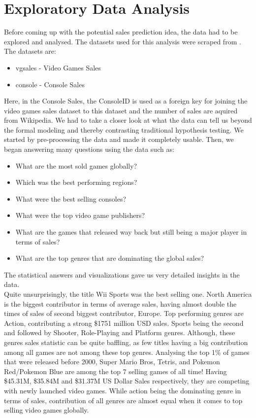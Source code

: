 \documentclass[conference]{IEEEtran}
\begin{document}
\section{Exploratory Data Analysis}
Before coming up with the potential sales prediction idea, the data had to be explored and analysed. The datasets used for this analysis were scraped from \cite{b2}. The datasets are:
\begin{itemize}
    \item vgsales - Video Games Sales \cite{b3}
    \item console - Console Sales \cite{b4}
\end{itemize}
Here, in the Console Sales, the ConsoleID is used as a foreign key for joining the video games sales dataset to this dataset and the number of sales are aquired from Wikipedia\cite{b5}. We had to take a closer look at what the data can tell us beyond the formal modeling and thereby contrasting traditional hypothesis testing. We started by pre-processing the data and made it completely usable. Then, we began answering many questions using the data such as:
\begin{itemize}
    \item What are the most sold games globally?
    \item Which was the best performing regions?
    \item What were the best selling consoles?
    \item What were the top video game publishers?
    \item What are the games that released way back but still being a major player in terms of sales?
    \item What are the top genres that are dominating the global sales?
\end{itemize}
The statistical answers and visualizations gave us very detailed insights in the data.\\
Quite unsurprisingly, the title Wii Sports was the best selling one. North America is the biggest contributor in terms of average sales, having almost double the times of sales of second biggest contributor, Europe.  Top performing genres are Action, contributing a strong \$1751 million USD sales. Sports being the second and followed by Shooter, Role-Playing and Platform genres. Although, these genres sales statistic can be quite baffling, as few titles having a big contribution among all games are not among these top genres. Analysing the top 1\% of games that were released before 2000, Super Mario Bros, Tetris, and Pokemon Red/Pokemon Blue are among the top 7 selling games of all time! Having \$45.31M, \$35.84M and \$31.37M US Dollar Sales respectively, they are competing with newly launched video games. While action being the dominating genre in terms of sales, contribution of all genres are almost equal when it comes to top selling video games globally. \\
\end{document}
